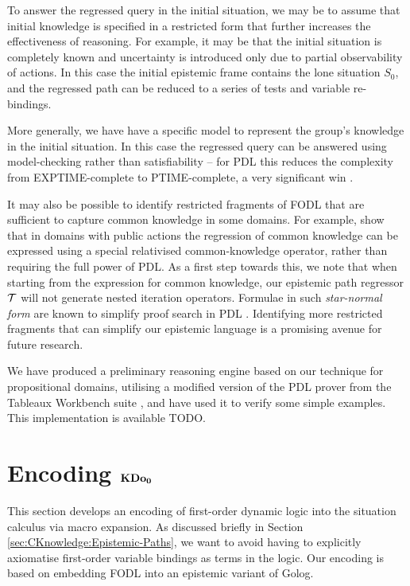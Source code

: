 To answer the regressed query in the initial situation, we may be
to assume that initial knowledge is specified in a restricted form
that further increases the effectiveness of reasoning. For example,
it may be that the initial situation is completely known and uncertainty
is introduced only due to partial observability of actions. In this
case the initial epistemic frame contains the lone situation $S_{0}$,
and the regressed path can be reduced to a series of tests and variable
re-bindings.

More generally, we have have a specific model to represent the group's
knowledge in the initial situation. In this case the regressed query
can be answered using model-checking rather than satisfiability --
for PDL this reduces the complexity from EXPTIME-complete to PTIME-complete,
a very significant win \citep{lange05pdl_model_checking}.

It may also be possible to identify restricted fragments of FODL that
are sufficient to capture common knowledge in some domains. For example,
\citet{vanBenthem06lcc} show that in domains with public actions
the regression of common knowledge can be expressed using a special
relativised common-knowledge operator, rather than requiring the full
power of PDL. As a first step towards this, we note that when starting
from the expression for common knowledge, our epistemic path regressor
$\mathcal{T}$ will not generate nested iteration operators. Formulae in
such \emph{star-normal form} are known to simplify proof search in
PDL \citep{abate07twb_pdl}. Identifying more restricted fragments
that can simplify our epistemic language is a promising avenue for
future research.

We have produced a preliminary reasoning engine based on our technique
for propositional domains, utilising a modified version of the PDL
prover from the Tableaux Workbench suite \citep{abate07twb_pdl},
and have used it to verify some simple examples. This implementation
is available TODO.


\section{Encoding $\mathbf{KDo_{0}}$\label{sec:CKnowledge:Encoding-KDoZ}}

This section develops an encoding of first-order dynamic logic into
the situation calculus via macro expansion. As discussed briefly in
Section \ref{sec:CKnowledge:Epistemic-Paths}, we want to avoid having
to explicitly axiomatise first-order variable bindings as terms in
the logic. Our encoding is based on embedding FODL into an epistemic
variant of Golog.


